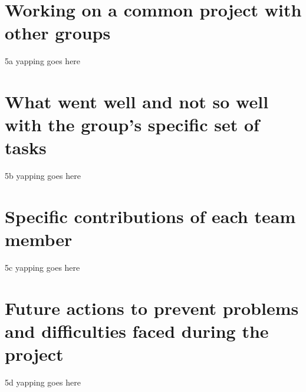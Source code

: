 \documentclass[12pt]{report}
\begin{document}
\section{Working on a common project with other groups}
5a yapping goes here

\section{What went well and not so well with the group's specific set of tasks}
5b yapping goes here

\section{Specific contributions of each team member}
5c yapping goes here

\section{Future actions to prevent problems and difficulties faced during the project}
5d yapping goes here
\end{document}
